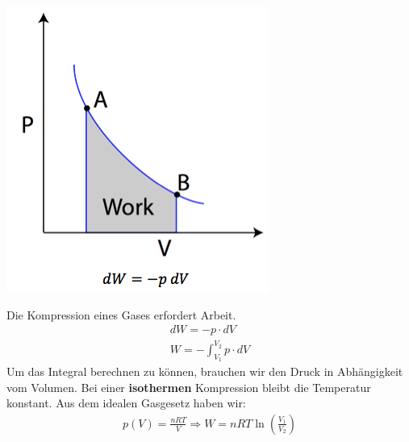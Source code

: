 \documentclass[
a4paper,
oneside,
landscape, 
8pt,
]{scrartcl}
\begin{document}
\begin{multicols*}{2}
\begin{minipage}[h!]{0.5\linewidth}
\includegraphics[width=0.8\linewidth]{images/gas_kompression}
\end{minipage}
\hfill
\begin{minipage}[h!]{0.5\linewidth}
Die Kompression eines Gases erfordert Arbeit.
\begin{align*}
dW= -p \cdot dV \\
W=- \int_{V_1}^{V_2}p \cdot dV
\end{align*}
Um das Integral berechnen zu können, brauchen wir den Druck in Abhängigkeit vom Volumen. Bei einer \textbf{isothermen} Kompression bleibt die Temperatur konstant. Aus dem idealen Gasgesetz haben wir:
\begin{align*}
p(V)=\frac{nRT}{V} \Rightarrow W = n R T \ln( \frac{V_1}{V_2})
\end{align*}
\end{minipage}

\vfill\null
\columnbreak


\end{multicols*}
\end{document}

